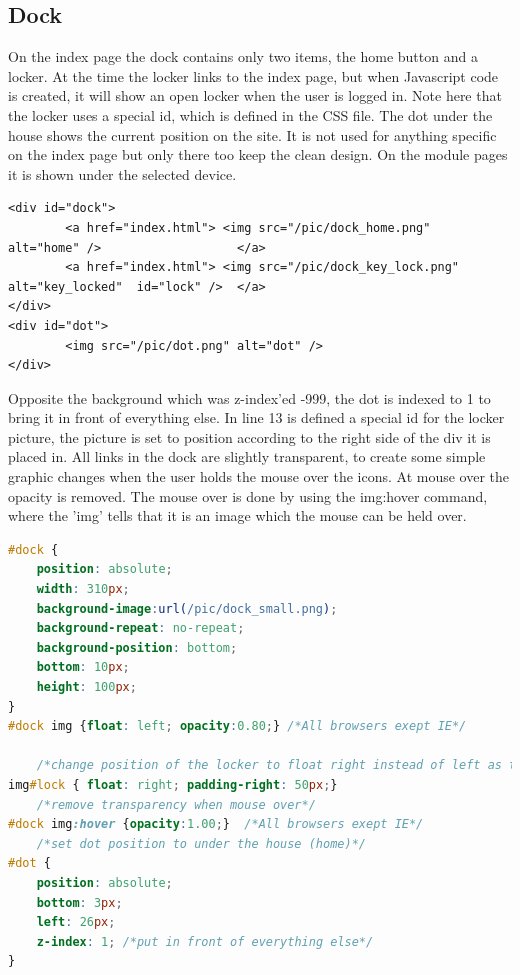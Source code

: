 \subsection{Dock}
On the index page the dock contains only two items, the home button and a locker. At the time the locker links to the index page, but when Javascript code is created, it will show an open locker when the user is logged in. Note here that the locker uses a special id, which is defined in the CSS file. The dot under the house shows the current position on the site. It is not used for anything specific on the index page but only there too keep the clean design. On the module pages it is shown under the selected device.
\begin{lstlisting}
<div id="dock">
		<a href="index.html"> <img src="/pic/dock_home.png" 		alt="home" /> 					</a>
		<a href="index.html"> <img src="/pic/dock_key_lock.png" 	alt="key_locked"  id="lock" /> 	</a>
</div>
<div id="dot">
		<img src="/pic/dot.png" alt="dot" />
</div>
\end{lstlisting}
Opposite the background which was z-index'ed -999, the dot is indexed to 1 to bring it in front of everything else. In line 13 is defined a special id for the locker picture, the picture is set to position according to the right side of the div it is placed in. All links in the dock are slightly transparent, to create some simple graphic changes when the user holds the mouse over the icons. At mouse over the opacity is removed. The mouse over is done by using the img:hover command, where the 'img' tells that it is an image which the mouse can be held over.
\begin{lstlisting}[language=CSS]
#dock {
	position: absolute;
	width: 310px;
	background-image:url(/pic/dock_small.png);
	background-repeat: no-repeat;
	background-position: bottom;
	bottom: 10px;
	height: 100px;
}
#dock img {float: left; opacity:0.80;} /*All browsers exept IE*/

	/*change position of the locker to float right instead of left as the other link(s)*/
img#lock { float: right; padding-right: 50px;}
	/*remove transparency when mouse over*/
#dock img:hover {opacity:1.00;}  /*All browsers exept IE*/
	/*set dot position to under the house (home)*/
#dot {
	position: absolute;
	bottom: 3px;
	left: 26px;
	z-index: 1; /*put in front of everything else*/
}
\end{lstlisting}
